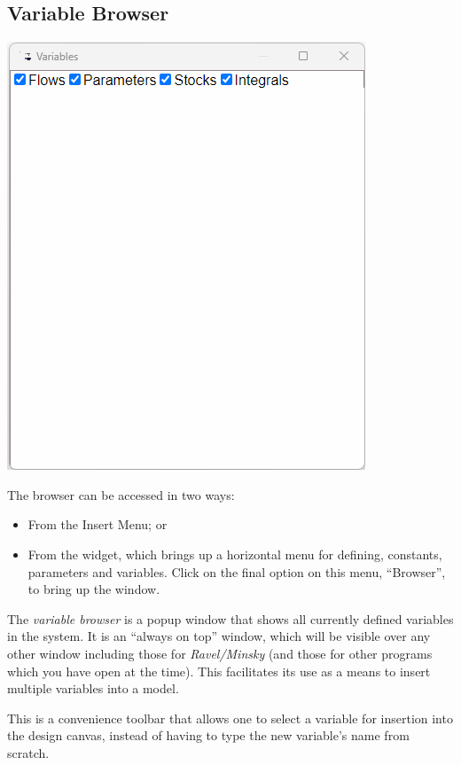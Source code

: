 \subsection{Variable Browser}

\label{VariableBrowser}

\includegraphics{images/browserWindow}

The browser can be accessed in two ways:
\begin{itemize}
\item From the Insert Menu; or 
\item From the  widget, which brings up a horizontal
menu for defining, constants, parameters and variables. Click on the
final option on this menu, ``Browser'', to bring up the window. 
\end{itemize}
The \emph{variable browser} is a popup window that shows all currently
defined variables in the system. It is an ``always on top'' window,
which will be visible over any other window including those for \emph{Ravel/Minsky}
(and those for other programs which you have open at the time). This
facilitates its use as a means to insert multiple variables into a
model.

This is a convenience toolbar that allows one to select a variable
for insertion into the design canvas, instead of having to type the
new variable's name from scratch.

